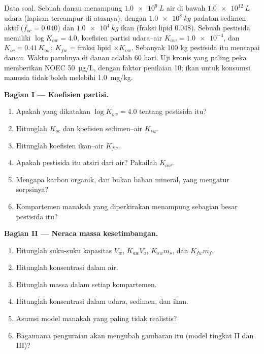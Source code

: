 \begin{problem}
\label{pb:b3:environmental-toxicology:1}
Data soal. Sebuah danau menampung $\qty{1.0e9}{L}$ air di bawah $\qty{1.0e12}{L}$ udara (lapisan tercampur di atasnya),
dengan $\qty{1.0e8}{kg}$ padatan sedimen aktif ($f_{oc} = 0.040$) dan $\qty{1.0e4}{kg}$ ikan (fraksi lipid 0.048).
Sebuah pestisida memiliki $\log K_{ow} = 4.0$, koefisien partisi udara--air $K_{aw} = \num{1.0e-4}$, dan $K_{oc} = 0.41\,K_{ow}$;
$K_{fw}$ = fraksi lipid $\times K_{ow}$. Sebanyak 100 kg pestisida itu mencapai danau. Waktu paruhnya di danau adalah 60 hari.
Uji kronis yang paling peka memberikan NOEC \qty{50}{\micro g/L}, dengan faktor penilaian 10;
ikan untuk konsumsi manusia tidak boleh melebihi \qty{1.0}{mg/kg}.

\medskip\noindent\textbf{Bagian I --- Koefisien partisi.}
\begin{enumerate}[beginpenalty=10000]
  \item Apakah yang dikatakan $\log K_{ow} = 4.0$ tentang pestisida itu?
  \item Hitunglah $K_{oc}$ dan koefisien sedimen--air $K_{sw}$.
  \item Hitunglah koefisien ikan--air $K_{fw}$.
  \item Apakah pestisida itu atsiri dari air? Pakailah $K_{aw}$.
  \item Mengapa karbon organik, dan bukan bahan mineral, yang mengatur sorpsinya?
  \item Kompartemen manakah yang diperkirakan menampung sebagian besar pestisida itu?
\end{enumerate}

\medskip\noindent\textbf{Bagian II --- Neraca massa kesetimbangan.}
\begin{enumerate}[resume, beginpenalty=10000]
  \item Hitunglah suku-suku kapasitas $V_w$, $K_{aw}V_a$, $K_{sw}m_s$, dan $K_{fw}m_f$.
  \item Hitunglah konsentrasi dalam air.
  \item Hitunglah massa dalam setiap kompartemen.
  \item Hitunglah konsentrasi dalam udara, sedimen, dan ikan.
  \item Asumsi model manakah yang paling tidak realistis?
  \item Bagaimana penguraian akan mengubah gambaran itu (model tingkat II dan III)?
\end{enumerate}


\end{problem}
